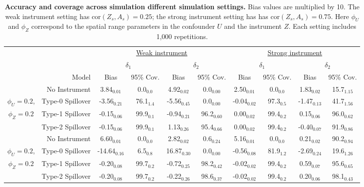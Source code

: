 \documentclass[12pt]{article}
\begin{document}
\begin{table}
\caption{\textbf{Accuracy and coverage across simulation different simulation settings.} Bias values are multiplied by 10. The weak instrument setting has cor$(Z_s,A_s) = 0.25$; the strong instrument setting has has cor$(Z_s,A_s) = 0.75$. Here $\phi_U$ and $\phi_Z$ correspond to the spatial range parameters in the confounder $U$ and the instrument $Z$. Each setting includes 1,000 repetitions.}
\label{simsTable}
\scriptsize
\centering
\begin{tabular}{c|r|cccc|cccc}
&&
\multicolumn{4}{c}{\underline{Weak instrument}} & 
\multicolumn{4}{|c}{\underline{Strong instrument}} \\
&&
\multicolumn{2}{c}{\underline{$~~~~~~~~~~~~\delta_1~~~~~~~~~~~~$}} & 
\multicolumn{2}{c|}{\underline{$~~~~~~~~~~~~\delta_2~~~~~~~~~~~~$}} &
\multicolumn{2}{c}{\underline{$~~~~~~~~~~~~\delta_1~~~~~~~~~~~~$}} & 
\multicolumn{2}{c}{\underline{$~~~~~~~~~~~~\delta_2~~~~~~~~~~~~$}} \\
&Model & 
Bias & 95\% Cov. & Bias & 95\% Cov. &
Bias & 95\% Cov. & Bias & 95\% Cov. \\
\hline
& No Instrument & 3.84$_{0.01}$ & 0.0$_{0.0}$ & 4.92$_{0.02}$ & 0.0$_{0.00}$ & 2.50$_{0.01}$ & 0.0$_{0.0}$ & 1.83$_{0.02}$ & 15.7$_{1.15}$ \\
$\phi_U=0.2$,& Type-0 Spillover &-3.56$_{0.21}$ & 76.1$_{1.4}$ & -5.56$_{0.45}$ & 0.0$_{0.00}$ & -0.04$_{0.02}$ & 97.3$_{0.5}$ & -1.47$_{0.13}$ & 41.7$_{1.56}$ \\
$\phi_Z=0.2$& Type-1 Spillover &-0.15$_{0.06}$ & 99.9$_{0.1}$ & -0.94$_{0.21}$ & 96.2$_{0.60}$ & 0.00$_{0.02}$ & 99.4$_{0.2}$ & 0.15$_{0.06}$ & 96.0$_{0.62}$ \\
& Type-2 Spillover & -0.15$_{0.06}$ & 99.9$_{0.1}$ & 1.13$_{0.26}$ & 95.4$_{0.66}$ & 0.00$_{0.02}$ & 99.4$_{0.2}$ & -0.40$_{0.07}$ & 91.9$_{0.86}$ \\
\hline
& No Instrument & 6.60$_{0.01}$ & 0.0$_{0.0}$ & 2.82$_{0.02}$ & 0.6$_{0.24}$ & 5.16$_{0.01}$ & 0.0$_{0.0}$ & 0.21$_{0.02}$ & 90.2$_{0.94}$ \\
$\phi_U=0.2$,& Type-0 Spillover &-14.64$_{0.16}$ & 6.5$_{0.8}$ & 16.87$_{0.30}$ & 0.0$_{0.00}$ & -0.56$_{0.08}$ & 81.9$_{1.2}$ & -2.69$_{0.24}$ & 19.6$_{1.26}$ \\
$\phi_Z=0.2$& Type-1 Spillover &-0.20$_{0.08}$ & 99.7$_{0.2}$ & -0.72$_{0.25}$ & 98.2$_{0.42}$ & -0.02$_{0.02}$ & 99.4$_{0.2}$ & 0.59$_{0.07}$ & 95.6$_{0.65}$ \\
& Type-2 Spillover &  -0.20$_{0.08}$ & 99.7$_{0.2}$ & -0.22$_{0.26}$ & 98.6$_{0.37}$ & -0.02$_{0.02}$ & 99.4$_{0.2}$ & 0.20$_{0.06}$ & 98.1$_{0.43}$ \\

\end{tabular}
\end{table}
\end{document}
